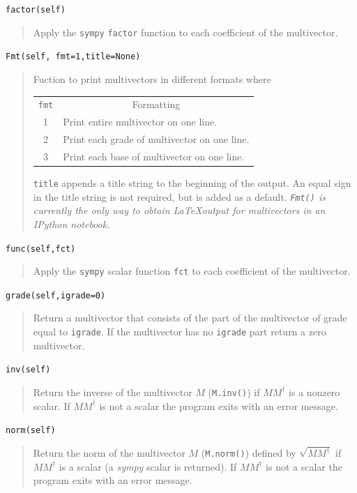 \documentclass[12pt]{report}
\newcommand{\R}{\dagger}
\newcommand{\T}[1]{\texttt{#1}}
\begin{document}
\T{factor(self)}
\begin{quote}
   Apply the \T{sympy} \T{factor} function to each coefficient of the multivector.
\end{quote}

\T{Fmt(self, fmt=1,title=None)}
\begin{quote}
	Fuction to print multivectors in different formats where
	\begin{center}
	\begin{longtable}{cl}
	\T{fmt} & \multicolumn{1}{c}{Formatting} \\
	1 & Print entire multivector on one line. \\
	2 & Print each grade of multivector on one line.\\
	3 & Print each base of multivector on one line.
	\end{longtable}	
	\end{center}
	\T{title} appends a title string to the beginning of the output.  An equal sign in
	the title string is not required, but is added as a default.
	\emph{\T{Fmt()} is currently the only way to obtain \LaTeX output for multivectors in 
	an IPython notebook.} 
\end{quote}

\T{func(self,fct)}
\begin{quote}
   Apply the \T{sympy} scalar function \T{fct} to each coefficient of the multivector.
\end{quote}

\T{grade(self,igrade=0)}
\begin{quote}
    Return a multivector that consists of the part of the multivector of
    grade equal to \T{igrade}.  If the multivector has no \T{igrade} part
    return a zero multivector.
\end{quote}

\T{inv(self)}
\begin{quote}
   Return the inverse of the multivector $M$ (\T{M.inv()}) if $MM^{\R}$ is a nonzero scalar.  If $MM^{\R}$
   is not a scalar the program exits with an error message.
\end{quote}

\T{norm(self)}
\begin{quote}
   Return the norm of the multivector $M$ (\T{M.norm()}) defined by $\sqrt{MM^{\R}}$ if $MM^{\R}$ is a scalar (a \emph{sympy} scalar 
   is returned).  If $MM^{\R}$ is not a scalar the program exits with an error message.
\end{quote}
\end{document}
